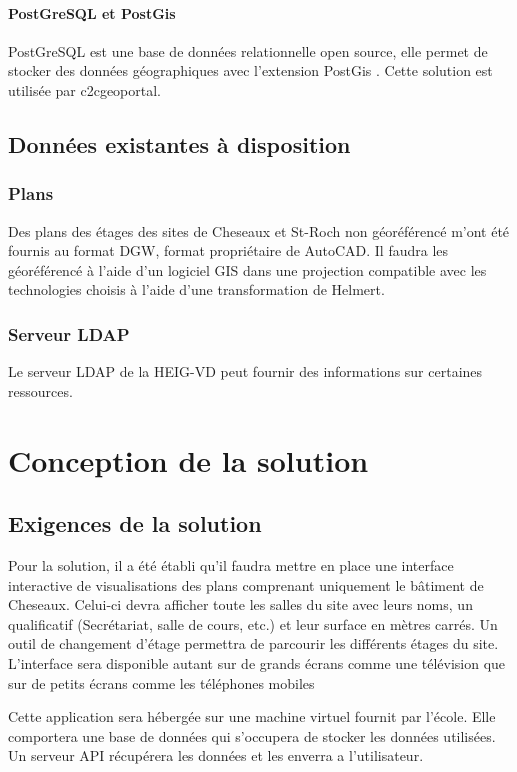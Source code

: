 \documentclass[
    iai, %
    il, %
]{heig-tb}
\begin{document}
\subsubsection{PostGreSQL et PostGis}
PostGreSQL est une base de données relationnelle open source, elle permet de stocker des données géographiques avec l'extension PostGis  \cite{postgis}.
Cette solution est utilisée par c2cgeoportal.

\section{Données existantes à disposition}
\subsection{Plans}
Des plans des étages des sites de Cheseaux et St-Roch non géoréférencé m'ont été fournis au format DGW, format propriétaire de AutoCAD.
Il faudra les géoréférencé à l'aide d'un logiciel GIS dans une projection compatible avec les technologies choisis à l'aide d'une transformation de Helmert.

\subsection{Serveur LDAP}
Le serveur LDAP de la HEIG-VD peut fournir des informations sur certaines ressources.



\chapter{Conception de la solution}

\section{Exigences de la solution}
Pour la solution, il a été établi qu'il faudra mettre en place une interface interactive de visualisations des plans comprenant uniquement le bâtiment de Cheseaux.
Celui-ci devra afficher toute les salles du site avec leurs noms, un qualificatif (Secrétariat, salle de cours, etc.) et leur surface en mètres carrés.
Un outil de changement d'étage permettra de parcourir les différents étages du site.
L'interface sera disponible autant sur de grands écrans comme une télévision que sur de petits écrans comme les téléphones mobiles

Cette application sera hébergée sur une machine virtuel fournit par l'école.
Elle comportera une base de données qui s'occupera de stocker les données utilisées.
Un serveur API récupérera les données et les enverra a l'utilisateur.
\end{document}
